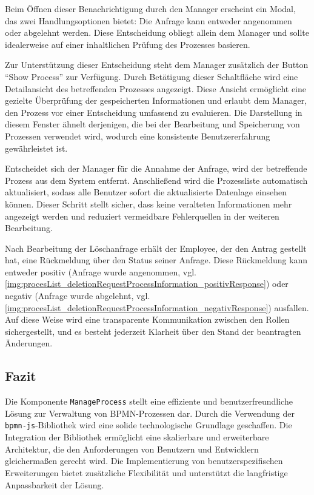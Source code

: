 
\newpage
Beim Öffnen dieser Benachrichtigung durch den Manager erscheint ein Modal, das zwei Handlungsoptionen bietet: Die Anfrage kann entweder angenommen oder abgelehnt werden. Diese Entscheidung obliegt allein dem Manager und sollte idealerweise auf einer inhaltlichen Prüfung des Prozesses basieren.


Zur Unterstützung dieser Entscheidung steht dem Manager zusätzlich der Button \enquote{Show Process} zur Verfügung. Durch Betätigung dieser Schaltfläche wird eine Detailansicht des betreffenden Prozesses angezeigt. Diese Ansicht ermöglicht eine gezielte Überprüfung der gespeicherten Informationen und erlaubt dem Manager, den Prozess vor einer Entscheidung umfassend zu evaluieren. Die Darstellung in diesem Fenster ähnelt derjenigen, die bei der Bearbeitung und Speicherung von Prozessen verwendet wird, wodurch eine konsistente Benutzererfahrung gewährleistet ist.


Entscheidet sich der Manager für die Annahme der Anfrage, wird der betreffende Prozess aus dem System entfernt. Anschließend wird die Prozessliste automatisch aktualisiert, sodass alle Benutzer sofort die aktualisierte Datenlage einsehen können. Dieser Schritt stellt sicher, dass keine veralteten Informationen mehr angezeigt werden und reduziert vermeidbare Fehlerquellen in der weiteren Bearbeitung.

Nach Bearbeitung der Löschanfrage erhält der Employee, der den Antrag gestellt hat, eine Rückmeldung über den Status seiner Anfrage. Diese Rückmeldung kann entweder positiv (Anfrage wurde angenommen, vgl. \autoref{img:procesList_deletionRequestProcessInformation_positivResponse}) oder negativ (Anfrage wurde abgelehnt, vgl. \autoref{img:procesList_deletionRequestProcessInformation_negativResponse}) ausfallen. Auf diese Weise wird eine transparente Kommunikation zwischen den Rollen sichergestellt, und es besteht jederzeit Klarheit über den Stand der beantragten Änderungen.


\newpage
\subsection*{Fazit}
Die Komponente \texttt{ManageProcess} stellt eine effiziente und benutzerfreundliche Lösung zur Verwaltung von BPMN-Prozessen dar. Durch die Verwendung der \texttt{bpmn-js}-Bibliothek wird eine solide technologische Grundlage geschaffen. Die Integration der Bibliothek ermöglicht eine skalierbare und erweiterbare Architektur, die den Anforderungen von Benutzern und Entwicklern gleichermaßen gerecht wird.
Die Implementierung von benutzerspezifischen Erweiterungen bietet zusätzliche Flexibilität und unterstützt die langfristige Anpassbarkeit der Lösung.

